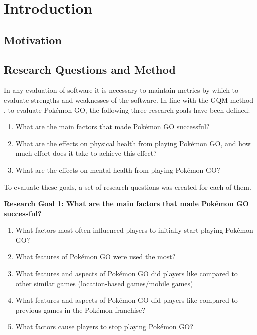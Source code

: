 
\chapter{Introduction}

\label{Chapter1}

\section{Motivation}


\section{Research Questions and Method}


In any evaluation of software it is necessary to maintain metrics by which to evaluate strengths and weaknesses of the software. In line with the GQM method , to evaluate Pokémon GO, the following three research goals have been defined:

\begin{enumerate}
	\item What are the main factors that made Pokémon GO successful?
	\item What are the effects on physical health from playing Pokémon GO, and how much effort does it take to achieve this effect?
	\item What are the effects on mental health from playing Pokémon GO?
\end{enumerate}

To evaluate these goals, a set of research questions was created for each of them.

\textbf{Research Goal 1: What are the main factors that made Pokémon GO successful?}

\begin{enumerate}
	\item What factors most often influenced players to initially start playing Pokémon GO?
	\item What features of Pokémon GO were used the most?
	\item What features and aspects of Pokémon GO did players like compared to other similar games (location-based games/mobile games)
	\item What features and aspects of Pokémon GO did players like compared to previous games in the Pokémon franchise?
	\item What factors cause players to stop playing Pokémon GO?
\end{enumerate}

